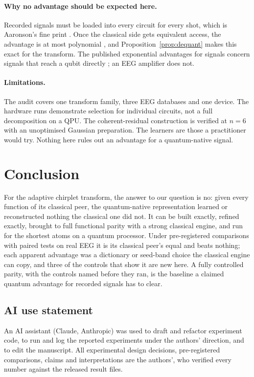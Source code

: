 \documentclass{article}
\begin{document}
\paragraph{Why no advantage should be expected here.} Recorded signals must be loaded into every circuit for every shot, which is Aaronson's fine print \citep{aaronson2015fineprint}. Once the classical side gets equivalent access, the advantage is at most polynomial \citep{tang2019quantum,chia2020sampling}, and Proposition~\ref{prop:dequant} makes this exact for the transform. The published exponential advantages for signals concern signals that reach a qubit directly \citep{huang2022advantage,kannan2026exponential}; an EEG amplifier does not.

\paragraph{Limitations.} The audit covers one transform family, three EEG databases and one device. The hardware runs demonstrate selection for individual circuits, not a full decomposition on a QPU. The coherent-residual construction is verified at $n=6$ with an unoptimised Gaussian preparation. The learners are those a practitioner would try. Nothing here rules out an advantage for a quantum-native signal.

\section{Conclusion}
For the adaptive chirplet transform, the answer to our question is no: given every function of its classical peer, the quantum-native representation learned or reconstructed nothing the classical one did not. It can be built exactly, refined exactly, brought to full functional parity with a strong classical engine, and run for the shortest atoms on a quantum processor. Under pre-registered comparisons with paired tests on real EEG it is its classical peer's equal and beats nothing; each apparent advantage was a dictionary or seed-band choice the classical engine can copy, and three of the controls that show it are new here. A fully controlled parity, with the controls named before they ran, is the baseline a claimed quantum advantage for recorded signals has to clear.

\subsection*{AI use statement}
An AI assistant (Claude, Anthropic) was used to draft and refactor experiment code, to run and log the reported experiments under the authors' direction, and to edit the manuscript. All experimental design decisions, pre-registered comparisons, claims and interpretations are the authors', who verified every number against the released result files.
\end{document}

